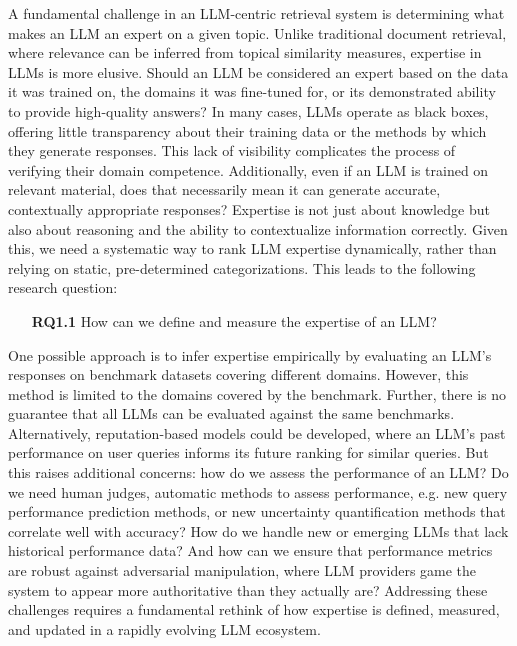 A fundamental challenge in an LLM-centric retrieval system is determining what makes an LLM an expert on a given topic. Unlike traditional document retrieval, where relevance can be inferred from topical similarity measures, expertise in LLMs is more elusive. Should an LLM be considered an expert based on the data it was trained on, the domains it was fine-tuned for, or its demonstrated ability to provide high-quality answers? In many cases, LLMs operate as black boxes, offering little transparency about their training data or the methods by which they generate responses. This lack of visibility complicates the process of verifying their domain competence. Additionally, even if an LLM is trained on relevant material, does that necessarily mean it can generate accurate, contextually appropriate responses? Expertise is not just about knowledge but also about reasoning and the ability to contextualize information correctly. Given this, we need a systematic way to rank LLM expertise dynamically, rather than relying on static, pre-determined categorizations. This leads to the following research question:

\begin{itemize}
    \item[\textbf{RQ1.1}] How can we define and measure the expertise of an LLM?
\end{itemize}

One possible approach is to infer expertise empirically by evaluating an LLM's responses on benchmark datasets covering different domains. However, this method is limited to the domains covered by the benchmark. Further, there is no guarantee that all LLMs can be evaluated against the same benchmarks. Alternatively, reputation-based models could be developed, where an LLM's past performance on user queries informs its future ranking for similar queries. But this raises additional concerns: how do we assess the performance of an LLM? Do we need human judges, automatic methods to assess performance, e.g. new query performance prediction methods, or new uncertainty quantification methods that correlate well with accuracy? How do we handle new or emerging LLMs that lack historical performance data? And how can we ensure that performance metrics are robust against adversarial manipulation, where LLM providers game the system to appear more authoritative than they actually are? %
Addressing these challenges requires a fundamental rethink of how expertise is defined, measured, and updated in a rapidly evolving LLM ecosystem.

